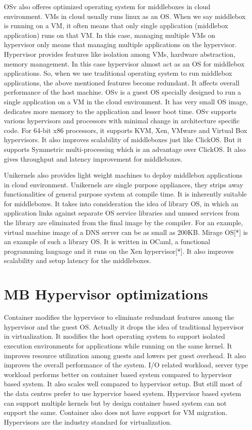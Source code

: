 \documentclass[a4paper,11pt]{report}
\begin{document}
OSv\cite{R2} also offeres optimized operating system for middleboxes in cloud environment. VMs in cloud usually runs linux as an OS. When we say middlebox is running on a VM, it often means that only single application (middlebox application) runs on that VM. In this case, managing multiple VMs on hypervisor only means that managing multiple applications on the hypervisor. Hypervisor provides features like isolation among VMs, hardware abstraction, memory management. In this case hypervisor almost act as an OS for middlebox applications. So, when we use traditional operating system to run middlebox applications, the above mentioned features become redundant. It affects overall performance of the host machine. OSv is a guest OS specially designed to run a single application on a VM in the cloud environment. It has very small OS image, dedicates more memory to the application and lesser boot time. OSv supports various hypervisors and processors with minimal change in architecture specific code. For 64-bit x86 processors, it supports KVM, Xen, VMware and Virtual Box hypervisors. It also improves scalability of middleboxes just like ClickOS. But it supports Symmetric multi-processing which is an advantage over ClickOS. It also gives throughput and latency improvement for middleboxes.

Unikernels\cite{R3} also provides light weight machines to deploy middlebox applications in cloud environment. Unikernels are single purpose appliances, they strips away functionalities of general purpose system at compile time. It is inherently suitable for middleboxes. It takes into consideration the idea of library OS, in which an application links against separate OS service libraries and unused services from the library are eliminated from the final image by the compiler. For an example, virtual machine image of a DNS server can be as small as 200KB. Mirage OS[*] is an example of such a library OS. It is written in OCaml, a functional programming language and it runs on the Xen hypervisor[*]. It also improves scalability and setup latency for the middleboxes.                    
\section{MB Hypervisor optimizations}
Container\cite{R4} modifies the hypervisor to eliminate redundant features among the hypervisor and the guest OS. Actually it drops the idea of traditional hypervisor in virtualization. It modifies the host operating system to support isolated execution environments for applications while running on the same kernel. It improves resource utilization among guests and lowers per guest overhead. It also improves the overall performance of the system. I/O related workload, server type workload performs better on container based system compared to hypervisor based system. It also scales well compared to hypervisor setup. But still most of the data centres prefer to use hypervior based system. Hypervisor based system can support multiple kernels but by design container based system can not support the same. Container also does not have support for VM migration. Hypervisors are the industry standard for virtualization.       
\end{document}
